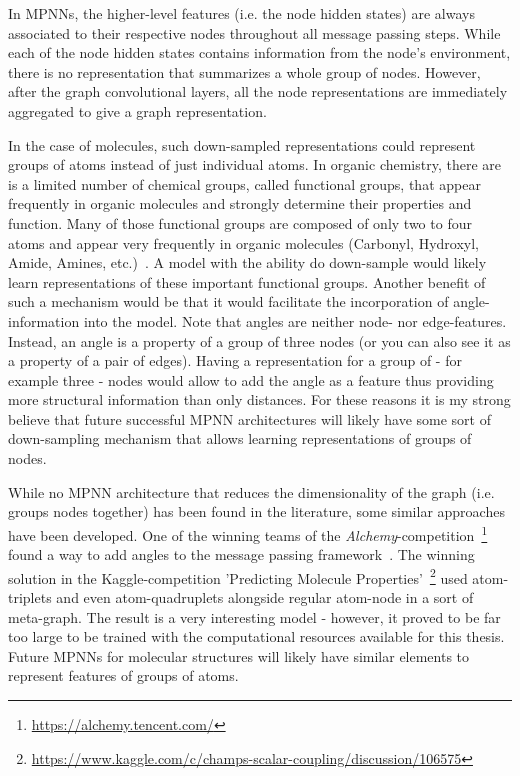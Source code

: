 In MPNNs, the higher-level features (i.e. the node hidden states) are always associated to their respective nodes throughout all message passing steps. While each of the node hidden states contains information from the node's environment, there is no representation that summarizes a whole group of nodes. However, after the graph convolutional layers, all the node representations are immediately aggregated to give a graph representation.

In the case of molecules, such down-sampled representations could represent groups of atoms instead of just individual atoms. In organic chemistry, there are is a limited number of chemical groups, called functional groups, that appear frequently in organic molecules and strongly determine their properties and function. Many of those functional groups are composed of only two to four atoms and appear very frequently in organic molecules (Carbonyl, Hydroxyl, Amide, Amines, etc.)~\cite{Organic-chemistry}. A model with the ability do down-sample would likely learn representations of these important functional groups. Another benefit of such a mechanism would be that it would facilitate the incorporation of angle-information into the model. Note that angles are neither node- nor edge-features. Instead, an angle is a property of a group of three nodes (or you can also see it as a property of a pair of edges). Having a representation for a group of - for example three - nodes would allow to add the angle as a feature thus providing more structural information than only distances. For these reasons it is my strong believe that future successful MPNN architectures will likely have some sort of down-sampling mechanism that allows learning representations of groups of nodes.

While no MPNN architecture that reduces the dimensionality of the graph (i.e. groups nodes together) has been found in the literature, some similar approaches have been developed. One of the winning teams of the \textit{Alchemy}-competition~\footnote{\url{https://alchemy.tencent.com/}} found a way to add angles to the message passing framework~\cite{Klicpera2019}. The winning solution in the Kaggle-competition 'Predicting Molecule Properties'~\footnote{\url{https://www.kaggle.com/c/champs-scalar-coupling/discussion/106575}} used atom-triplets and even atom-quadruplets alongside regular atom-node in a sort of meta-graph. The result is a very interesting model - however, it proved to be far too large to be trained with the computational resources available for this thesis. Future MPNNs for molecular structures will likely have similar elements to represent features of groups of atoms.

